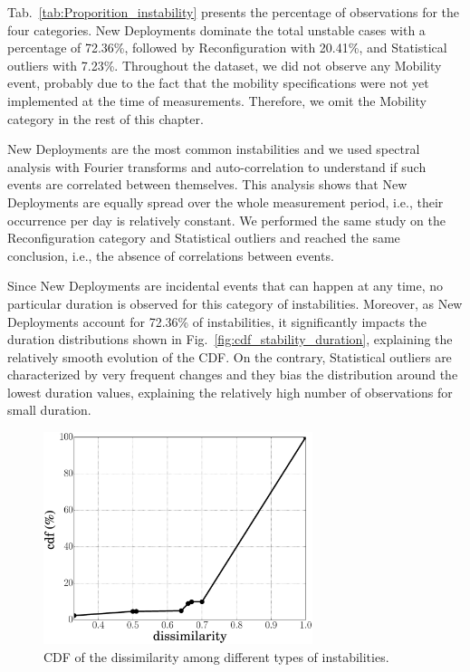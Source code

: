 Tab.~\ref{tab:Proporition_instability} presents the percentage of observations for the four categories. New Deployments dominate the total unstable cases with a percentage of 72.36\%, followed by Reconfiguration with 20.41\%, and Statistical outliers with 7.23\%. Throughout the dataset, we did not observe any Mobility event, probably due to the fact that the mobility specifications were not yet implemented at the time of measurements. Therefore, we omit the Mobility category in the rest of this chapter.

New Deployments are the most common instabilities and we used spectral analysis with Fourier transforms and auto-correlation to understand if such events are correlated between themselves. This analysis shows that New Deployments are equally spread over the whole measurement period, i.e., their occurrence per day is relatively constant. We performed the same study on the Reconfiguration category and Statistical outliers and reached the same conclusion, i.e., the absence of correlations between events.

Since New Deployments are incidental events that can happen at any time, no particular duration is observed for this category of instabilities. Moreover, as New Deployments account for 72.36\% of instabilities, it significantly impacts the duration distributions shown in Fig.~\ref{fig:cdf_stability_duration}, explaining the relatively smooth evolution of the CDF. On the contrary, Statistical outliers are characterized by very frequent changes and they bias the distribution around the lowest duration values, explaining the relatively high number of observations for small duration.

\begin{figure}[!t]
	\centering
	\includegraphics[width=0.7\textwidth]{Pics/cdf_dissmilarity.eps}
	\caption{CDF of the dissimilarity among different types of instabilities.}
	\label{fig:cdf_dissmilarity}
\end{figure}

